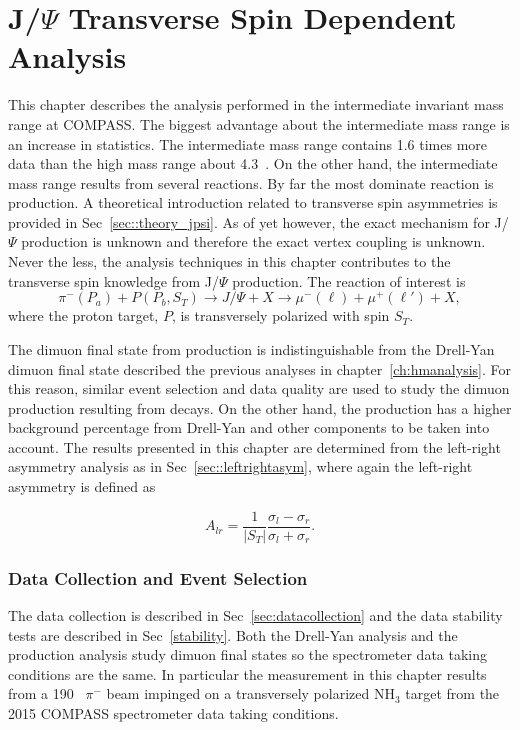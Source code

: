 \chapter{J/$\Psi$ Transverse Spin Dependent Analysis}
\label{ch::jpsi}
\ifpdf
\graphicspath{{Chapters/JPsi/Figs/}}
\fi

This chapter describes the analysis performed in the intermediate invariant mass
range at COMPASS.  The biggest advantage about the intermediate mass range is an
increase in statistics.  The intermediate mass range contains 1.6 times more
data than the high mass range about 4.3~{\gvcw}.  On the other hand, the
intermediate mass range results from several reactions.  By far the most
dominate reaction is {\jp} production.  A theoretical introduction related to
transverse {\jp} spin asymmetries is provided in Sec~\ref{sec::theory_jpsi}.  As
of yet however, the exact mechanism for J/$\Psi$ production is unknown and
therefore the exact {\jp} vertex coupling is unknown.  Never the less, the
analysis techniques in this chapter contributes to the transverse spin knowledge
from J/$\Psi$ production.  The reaction of interest is
\begin{equation}
  \pi^-(P_a) + P(P_b, S_T) \rightarrow J/\Psi + X \rightarrow \mu^-(\ell) +
  \mu^+(\ell') + X,
\end{equation}
\noindent
where the proton target, $P$, is transversely polarized with spin $S_T$.

The dimuon final state from {\jp} production is indistinguishable from the
Drell-Yan dimuon final state described the previous analyses in
chapter~\ref{ch:hmanalysis}.  For this reason, similar event selection and data
quality are used to study the dimuon production resulting from {\jp} decays.  On
the other hand, the {\jp} production has a higher background percentage from
Drell-Yan and other components to be taken into account.  The results presented
in this chapter are determined from the left-right asymmetry analysis as in
Sec~\ref{sec::leftrightasym}, where again the left-right asymmetry is defined as

\begin{equation}
  A_{lr} = \frac{1}{|S_T|}
  \frac{\sigma_l - \sigma_r}{\sigma_l +
    \sigma_r}.
\end{equation}

\subsection{Data Collection and Event Selection}
The data collection is described in Sec~\ref{sec:datacollection} and the data
stability tests are described in Sec~\ref{stability}.  Both the Drell-Yan
analysis and the {\jp} production analysis study dimuon final states so the
spectrometer data taking conditions are the same.  In particular the measurement
in this chapter results from a 190~{\gvc} $\pi^-$ beam impinged on a
transversely polarized NH$_3$ target from the 2015 COMPASS spectrometer data
taking conditions.

